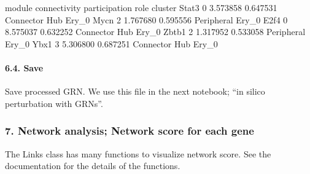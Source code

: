 \documentclass[letterpaper,10pt,english]{sphinxmanual}
\begin{document}
{\begin{sphinxVerbatim}[commandchars=\\\{\}]
       module  connectivity  participation           role cluster
Stat3       0      3.573858       0.647531  Connector Hub   Ery\_0
Mycn        2      1.767680       0.595556     Peripheral   Ery\_0
E2f4        0      8.575037       0.632252  Connector Hub   Ery\_0
Zbtb1       2      1.317952       0.533058     Peripheral   Ery\_0
Ybx1        3      5.306800       0.687251  Connector Hub   Ery\_0
\end{sphinxVerbatim}
}


\paragraph{6.4. Save}
\label{\detokenize{notebooks/04_Network_analysis/Network_analysis_with_Paul_etal_2015_data:6.4.-Save}}
Save processed GRN. We use this file in the next notebook; “in silico perturbation with GRNs”.

{
\begin{sphinxVerbatim}[commandchars=\\\{\}]
\llap{\color{nbsphinxin}[31]:\,\hspace{\fboxrule}\hspace{\fboxsep}}
\end{sphinxVerbatim}
}

{
\begin{sphinxVerbatim}[commandchars=\\\{\}]
\llap{\color{nbsphinxin}[70]:\,\hspace{\fboxrule}\hspace{\fboxsep}}
  

\end{sphinxVerbatim}
}


\subsubsection{7. Network analysis; Network score for each gene}
\label{\detokenize{notebooks/04_Network_analysis/Network_analysis_with_Paul_etal_2015_data:7.-Network-analysis;-Network-score-for-each-gene}}
The Links class has many functions to visualize network score. See the documentation for the details of the functions.
\end{document}
